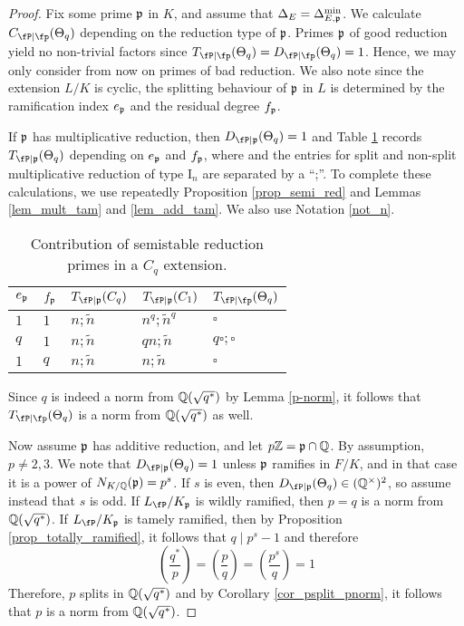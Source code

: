 \begin{proof}
    Fix some prime $\mathfrak{p}$ in $K$, and assume that $\Delta_E=\Delta_{E,\mathfrak{p}}^{\min}$. We calculate $\Cp(\Theta_q)$ depending on the reduction type of $\mathfrak{p}$. Primes $\mathfrak{p}$ of good reduction yield no non-trivial factors since $\Tp(\Theta_q)=\Dp(\Theta_q)=1$. Hence, we may only consider from now on primes of bad reduction. We also note since the extension $L/K$ is cyclic, the splitting behaviour of $\mathfrak{p}$ in $L$ is determined by the ramification index $e_{\mathfrak{p}}$ and the residual degree $f_{\mathfrak{p}}$. 
    
    If $\mathfrak{p}$ has multiplicative reduction, then $D_{\fP\mid\pp}(\Theta_q)=1$ and Table \ref{table_Cp} records $T_{\fP\mid\pp}(\Theta_q)$ depending on $e_{\mathfrak{p}}$ and $f_{\mathfrak{p}}$, where and the entries for split and non-split multiplicative reduction of type $\mathrm{I}_n$ are separated by a ``;''. To complete these calculations, we use repeatedly Proposition \ref{prop_semi_red} and Lemmas \ref{lem_mult_tam} and \ref{lem_add_tam}. We also use Notation \ref{not_n}.

    \begin{table}[!ht]
        \centering
        \begin{tabular}{|l|l|l|l|l|}
        \hline
        $e_{\mathfrak{p}}$ & $f_{\mathfrak{p}}$  & $T_{\fP\mid \pp}(C_q)$ & $T_{\fP\mid \pp}(C_1)$  & $\Tp(\Theta_q)$ \\ \hline
        $1$ & $1$ & $n;\tilde{n}$ & $n^q;\tilde{n}^q$ & $\square$ \\ \hline
        $q$ & $1$ & $n;\tilde{n}$ & $qn;\tilde{n}$ & $q\square;\square$ \\ \hline
        $1$ & $q$ & $n;\tilde{n}$ & $n;\tilde{n}$ & $\square$ \\ \hline
        \end{tabular}
        \caption{Contribution of semistable reduction primes in a $C_q$ extension.}
        \label{table_Cp}
    \end{table}

    Since $q$ is indeed a norm from $\mathbb{Q}(\sqrt{q^*})$ by Lemma \ref{p-norm}, it follows that $\Tp(\Theta_q)$ is a norm from $\mathbb{Q}(\sqrt{q^*})$ as well.

    Now assume $\mathfrak{p}$ has additive reduction, and let $p\mathbb{Z}=\mathfrak{p}\cap\mathbb{Q}$. By assumption, $p\neq2,3$. We note that $D_{\fP\mid\pp}(\Theta_q)=1$ unless $\mathfrak{p}$ ramifies in $F/K$, and in that case it is a power of $N_{K/\mathbb{Q}}(\mathfrak{p})=p^s$. If $s$ is even, then $D_{\fP\mid\pp}(\Theta_q)\in\QQss$, so assume instead that $s$ is odd. If $L_\fP/K_\pp$ is wildly ramified, then $p=q$ is a norm from $\mathbb{Q}(\sqrt{q^*})$. If $L_\fP/K_\pp$ is tamely ramified, then by Proposition \ref{prop_totally_ramified}, it follows that $q\mid p^s-1$ and therefore 
    \begin{equation*}
        \left(\frac{q^*}{p}\right)=\left(\frac{p}{q}\right)=\left(\frac{p^s}{q}\right)=1
    \end{equation*}
    Therefore, $p$ splits in $\mathbb{Q}(\sqrt{q^*})$ and by Corollary \ref{cor_psplit_pnorm}, it follows that $p$ is a norm from $\mathbb{Q}(\sqrt{q^*})$. 
    

\end{proof}
